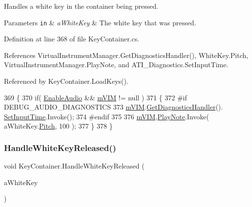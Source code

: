 Handles a white key in the container being pressed. 


\begin{DoxyParams}[1]{Parameters}
\mbox{\tt in}  & {\em a\+White\+Key} & The white key that was pressed. \\
\hline
\end{DoxyParams}


Definition at line 368 of file Key\+Container.\+cs.



References Virtual\+Instrument\+Manager.\+Get\+Diagnostics\+Handler(), White\+Key.\+Pitch, Virtual\+Instrument\+Manager.\+Play\+Note, and A\+T\+I\+\_\+\+Diagnostics.\+Set\+Input\+Time.



Referenced by Key\+Container.\+Load\+Keys().


\begin{DoxyCode}
369     \{
370         \textcolor{keywordflow}{if}( \hyperlink{group___key_contain_pub_var_ga5dc9b1349f8fafc894c7f739f6780a8c}{EnableAudio} && \hyperlink{group___key_contain_priv_var_ga57ee3824e2f284403bb70ad9c4dfd307}{mVIM} != null )
371         \{
372 \textcolor{preprocessor}{            #if DEBUG\_AUDIO\_DIAGNOSTICS}
373                 \hyperlink{group___key_contain_priv_var_ga57ee3824e2f284403bb70ad9c4dfd307}{mVIM}.\hyperlink{group___v_i_m_pub_func_ga7e60bc3c5464d8f34f0d56def675bcc6}{GetDiagnosticsHandler}().
      \hyperlink{group___audio_testing_a133561901c2aef535b2f3c098e55b959}{SetInputTime}.Invoke();
374 \textcolor{preprocessor}{            #endif}
375 
376             \hyperlink{group___key_contain_priv_var_ga57ee3824e2f284403bb70ad9c4dfd307}{mVIM}.\hyperlink{group___v_i_m_events_gaa21021c13a8c9d13cbf374d5bf9d68fa}{PlayNote}.Invoke( aWhiteKey.\hyperlink{group___white_key_pub_var_ga1ddd98b85ba069defc7cf47d25f625f4}{Pitch}, 100 );
377         \}
378     \}
\end{DoxyCode}
\mbox{\label{group___key_contain_event_handlers_ga5b98b0105300225fd79638525ad3cb3c}} 
\subsubsection{\texorpdfstring{Handle\+White\+Key\+Released()}{HandleWhiteKeyReleased()}}
{\footnotesize\ttfamily void Key\+Container.\+Handle\+White\+Key\+Released (\begin{DoxyParamCaption}\item[{\hyperlink{class_white_key}{White\+Key}}]{a\+White\+Key }\end{DoxyParamCaption})\hspace{0.3cm}{\ttfamily [private]}}



